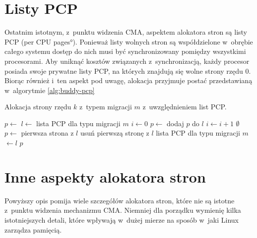 \section{Listy PCP}\label{sec:pcp-lists}

Ostatnim istotnym, z~punktu widzenia CMA, aspektem alokatora stron są
listy PCP (\ang{per CPU pages}).  Ponieważ listy wolnych stron są
współdzielone w~obrębie całego systemu dostęp do nich musi być
synchronizowany pomiędzy wszystkimi procesorami.  Aby uniknąć kosztów
związanych z~synchronizacją, każdy procesor posiada swoje prywatne
listy PCP, na których znajdują się wolne strony rzędu 0.  Biorąc
również i~ten aspekt pod uwagę, alokacja przyjmuje postać
przedstawianą w~algorytmie \ref{alg:buddy-pcp}

\begin{algorithm}
\caption[Alokacja z~uwzględnieniem list PCP.]{Alokacja strony rzędu
  $k$ z~typem migracji $m$ z~uwzględnieniem list PCP.}
\label{alg:buddy-pcp}
\begin{algorithmic}[1]
        \State $p \gets$ 
    \Else
        \State $l \gets$ lista PCP dla typu migracji $m$
            \State $i \gets 0$
            \Repeat
                \State $p \gets$ 
                    \State dodaj $p$ do $l$
                    \State $i \gets i + 1$
                \EndIf
             
        \EndIf
            \State \Return $\emptyset$
        \Else
            \State $p \gets$ pierwsza strona z $l$
            \State usuń pierwszą stronę z $l$
            \State lista PCP dla typu migracji $m$ $\gets l$
        \EndIf
    \EndIf
    \State \Return $p$
\EndFunction
\end{algorithmic}
\end{algorithm}


\section{Inne aspekty alokatora stron}

Powyższy opis pomija wiele szczegółów alokatora stron, które nie są
istotne z~punktu widzenia mechanizmu CMA.  Niemniej dla porządku
wymienię kilka istotniejszych detali, które wpływają w~dużej mierze na
sposób w~jaki Linux zarządza pamięcią.

